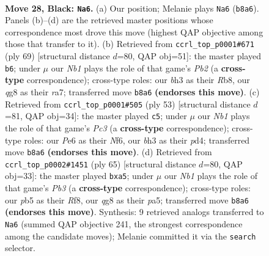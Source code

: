 \documentclass[11pt]{article}
\begin{document}
\clearpage

\begin{figure}[p]\centering
\begin{subfigure}{0.46\textwidth}\centering
\resizebox{\linewidth}{!}{%
\newchessgame
\chessboard[
  setfen={rn4Q1/pp1k4/1p2p1p1/1P1pP3/1P1P4/2N4B/8/4K1N1 b - - 0 28},
  showmover=false,
  pgfstyle=straightmove, color=movearrow, markmove={b8-a6}
]}
\caption{}
\end{subfigure}\hfill
\begin{subfigure}{0.46\textwidth}\centering
\resizebox{\linewidth}{!}{%
\newchessgame
\chessboard[
  setfen={1r6/Rp2bk2/2p3p1/2P1p2p/1Pb1B3/4P1P1/5N1P/4K3 b - - 1 35},
  showmover=false,
  pgfstyle=straightmove, color=movearrow, markmove={b7-b6}
]}
\caption{}
\end{subfigure}
\\[4pt]
\begin{subfigure}{0.46\textwidth}\centering
\resizebox{\linewidth}{!}{%
\newchessgame
\chessboard[
  setfen={2r2k2/7p/1pp2n2/p2p4/P2P1N1p/1P2PP2/8/2R2K2 b - - 0 27},
  showmover=false,
  pgfstyle=straightmove, color=movearrow, markmove={c6-c5}
]}
\caption{}
\end{subfigure}\hfill
\begin{subfigure}{0.46\textwidth}\centering
\resizebox{\linewidth}{!}{%
\newchessgame
\chessboard[
  setfen={5r2/p1k4p/1pp2p2/Pnb4P/5PN1/1K2P3/5PB1/3R4 b - - 0 33},
  showmover=false,
  pgfstyle=straightmove, color=movearrow, markmove={b6-a5}
]}
\caption{}
\end{subfigure}
\caption{\textbf{Move 28, Black: \texttt{Na6}.} (a) Our position; Melanie plays \texttt{Na6} (\texttt{b8a6}). Panels (b)--(d) are the retrieved master positions whose correspondence most drove this move (highest QAP objective among those that transfer to it). (b) Retrieved from \texttt{ccrl\_top\_p0001\#671} (ply 69) [structural distance $d$=80, QAP obj=51]: the master played \texttt{b6}; under $\mu$ our \emph{Nb1} plays the role of that game's \emph{Pb2} (a \textbf{cross-type} correspondence); cross-type roles: our \emph{b}h3 as their \emph{R}b8, our \emph{q}g8 as their \emph{r}a7; transferred move \texttt{b8a6} \textbf{(endorses this move)}. (c) Retrieved from \texttt{ccrl\_top\_p0001\#505} (ply 53) [structural distance $d$=81, QAP obj=34]: the master played \texttt{c5}; under $\mu$ our \emph{Nb1} plays the role of that game's \emph{Pc3} (a \textbf{cross-type} correspondence); cross-type roles: our \emph{P}e6 as their \emph{N}f6, our \emph{b}h3 as their \emph{p}d4; transferred move \texttt{b8a6} \textbf{(endorses this move)}. (d) Retrieved from \texttt{ccrl\_top\_p0002\#1451} (ply 65) [structural distance $d$=80, QAP obj=33]: the master played \texttt{bxa5}; under $\mu$ our \emph{Nb1} plays the role of that game's \emph{Pb3} (a \textbf{cross-type} correspondence); cross-type roles: our \emph{p}b5 as their \emph{R}f8, our \emph{q}g8 as their \emph{p}a5; transferred move \texttt{b8a6} \textbf{(endorses this move)}. Synthesis: 9 retrieved analogs transferred to \texttt{Na6} (summed QAP objective 241, the strongest correspondence among the candidate moves); Melanie committed it via the \texttt{search} selector.}
\label{fig:thought-m55}
\end{figure}
\end{document}
